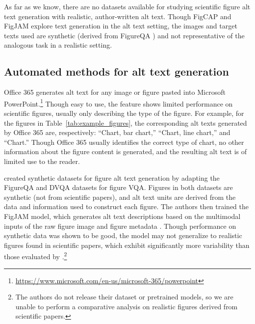 \documentclass[sigconf]{acmart}
\begin{document}
As far as we know, there are no datasets available for studying scientific figure alt text generation with realistic, author-written alt text. Though FigCAP \citep{Chen2019NeuralCG, Chen2019FigureCW} and FigJAM \cite{Qian2021GeneratingAC} explore text generation in the alt text setting, the images and target texts used are synthetic (derived from FigureQA \citep{Kahou2018FigureQAAA}) and not representative of the analogous task in a realistic setting.



\subsection{Automated methods for alt text generation}
\label{sec:rw_alttext_generation}

Office 365 generates alt text for any image or figure pasted into Microsoft PowerPoint.\footnote{\href{https://www.microsoft.com/en-us/microsoft-365/powerpoint}{https://www.microsoft.com/en-us/microsoft-365/powerpoint}} Though easy to use, the feature shows limited performance on scientific figures, usually only describing the type of the figure. For example, for the figures in Table~\ref{tab:example_figures}, the corresponding alt texts generated by Office 365 are, respectively: ``Chart, bar chart,'' ``Chart, line chart,'' and ``Chart.'' Though Office 365 usually identifies the correct type of chart, no other information about the figure content is generated, and the resulting alt text is of limited use to the reader. 

\citet{Qian2021GeneratingAC} created synthetic datasets for figure alt text generation by adapting the FigureQA \citep{Kahou2018FigureQAAA} and DVQA \citep{Kafle2018DVQAUD} datasets for figure VQA. Figures in both datasets are synthetic (not from scientific papers), and alt text units are derived from the data and information used to construct each figure. The authors then trained the FigJAM model, which generates alt text descriptions based on the multimodal inputs of the raw figure image and figure metadata \citep{Qian2021GeneratingAC}. Though performance on synthetic data was shown to be good, the model may not generalize to realistic figures found in scientific papers, which exhibit significantly more variability than those evaluated by \citet{Qian2021GeneratingAC}.\footnote{The authors do not release their dataset or pretrained models, so we are unable to perform a comparative analysis on realistic figures derived from scientific papers.}
\end{document}
